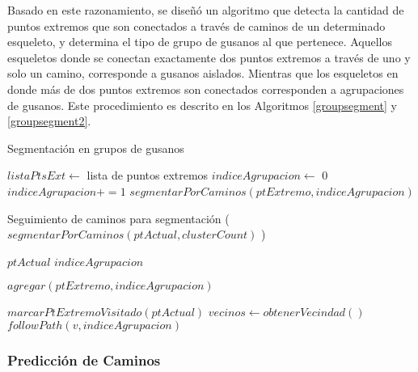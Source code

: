 Basado en este razonamiento, se dise\~n\'o un algoritmo que detecta la cantidad de
puntos extremos que son conectados a trav\'es de caminos de un determinado esqueleto,
y determina el tipo de grupo de gusanos al que pertenece. Aquellos esqueletos donde
se conectan exactamente dos puntos extremos a trav\'es de uno y solo un camino, corresponde
a gusanos aislados. Mientras que los esqueletos en donde m\'as de dos puntos extremos son
conectados corresponden a agrupaciones de gusanos.
Este procedimiento es descrito en los Algoritmos \ref{groupsegment} y \ref{groupsegment2}.

\begin{algorithm}[h]                     
\caption{Segmentaci\'on en grupos de gusanos}         
\label{groupsegment}                    
\begin{algorithmic}                   

\STATE $listaPtsExt \leftarrow$ lista de puntos extremos
\STATE $indiceAgrupacion \leftarrow$ 0
\STATE {}
\ELSE
\STATE $indiceAgrupacion +=1$
\STATE $segmentarPorCaminos(ptExtremo,indiceAgrupacion)$
\ENDIF
\ENDFOR
\end{algorithmic}
\end{algorithm}

\begin{algorithm}[h]                     
\caption{Seguimiento de caminos para segmentaci\'on ($segmentarPorCaminos(ptActual,clusterCount)$ )}         
\label{groupsegment2}
\begin{algorithmic}                   

\REQUIRE $ptActual$
\REQUIRE $indiceAgrupacion$

\RETURN 
\ELSE
\STATE $agregar(ptExtremo,indiceAgrupacion)$
\ENDIF

\STATE {}
\STATE $marcarPtExtremoVisitado(ptActual)$
\ENDIF
\STATE $vecinos \leftarrow obtenerVecindad()$
\STATE $followPath(v,indiceAgrupacion)$
\ENDFOR

\end{algorithmic}
\end{algorithm}


\subsubsection*{Predicci\'on de Caminos}
\label{sec:pathguessing}

